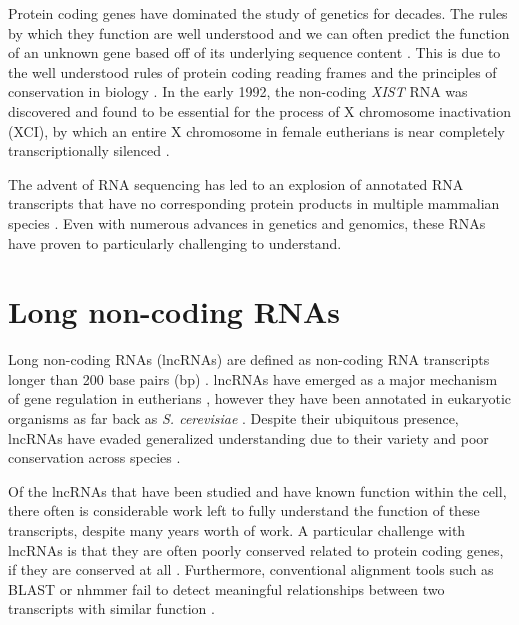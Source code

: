 Protein coding genes have dominated the study of genetics for decades. The rules by which they function are well understood and we can often predict the function of an unknown gene based off of its underlying sequence content \cite{Whisstock2003PredictionStructure}. This is due to the well understood rules of protein coding reading frames and the principles of conservation in biology \cite{Burge1997PredictionDNA,Altschul1990BasicTool,Wheeler2013Nhmmer:HMMs}. In the early 1992, the non-coding \emph{XIST} RNA was discovered and found to be essential for the process of X chromosome inactivation (XCI), by which an entire X chromosome in female eutherians is near completely transcriptionally silenced \cite{Brown10TheNucleus.,Brockdorff10TheNucleus.}.

The advent of RNA sequencing has led to an explosion of annotated RNA transcripts that have no corresponding protein products in multiple mammalian species \cite{Derrien2012TheExpression,Hon2017AnEnds,Bogu2016ChromatinMouse}. Even with numerous advances in genetics and genomics, these RNAs have proven to particularly challenging to understand. 
\section{Long non-coding RNAs}
Long non-coding RNAs (lncRNAs) are defined as non-coding RNA transcripts longer than 200 base pairs (bp) \cite{Derrien2012TheExpression}. lncRNAs have emerged as a major mechanism of gene regulation in eutherians \cite{Sarropoulos2019DevelopmentalSpecies,Bogu2016ChromatinMouse,Sauvageau2013MultipleDevelopment}, however they have been annotated in eukaryotic organisms as far back as \emph{S. cerevisiae} \cite{Niederer2017LongCerevisiae}. Despite their ubiquitous presence, lncRNAs have evaded generalized understanding due to their variety and poor conservation across species \cite{Johnsson2014EvolutionaryFunction}. 

Of the lncRNAs that have been studied and have known function within the cell, there often is considerable work left to fully understand the function of these transcripts, despite many years worth of work. A particular challenge with lncRNAs is that they are often poorly conserved related to protein coding genes, if they are conserved at all \cite{Sleutels2002TheGenes,Pang2006RapidFunction, Johnsson2014EvolutionaryFunction}. Furthermore, conventional alignment tools such as BLAST or nhmmer fail to detect meaningful relationships between two transcripts with similar function \cite{Kirk2018FunctionalContent,Sprague2019NonlinearDomains}. 

